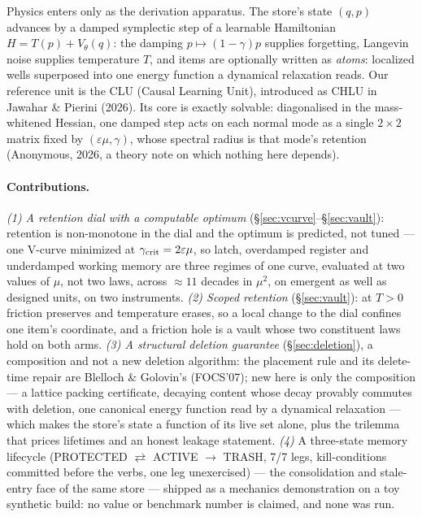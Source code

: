 Physics enters only as the derivation apparatus. The store's state $(q,p)$ advances by a damped symplectic step of a learnable Hamiltonian $H=T(p)+V_\theta(q)$: the damping $p\mapsto(1-\gamma)p$ supplies forgetting, Langevin noise supplies temperature $T$, and items are optionally written as \emph{atoms}: localized wells superposed into one energy function a dynamical relaxation reads. Our reference unit is the CLU (Causal Learning Unit), introduced as CHLU in Jawahar \& Pierini (2026). Its core is exactly solvable: diagonalised in the mass-whitened Hessian, one damped step acts on each normal mode as a single $2\times2$ matrix fixed by $(\varepsilon\mu,\gamma)$, whose spectral radius is that mode's retention (Anonymous, 2026, a theory note on which nothing here depends).

\paragraph{Contributions.} \emph{(1) A retention dial with a computable optimum} (\S\ref{sec:vcurve}--\S\ref{sec:vault}): retention is non-monotone in the dial and the optimum is predicted, not tuned --- one V-curve minimized at $\gamma_{\rm crit}=2\varepsilon\mu$, so latch, overdamped register and underdamped working memory are three regimes of one curve, evaluated at two values of $\mu$, not two laws, across $\approx11$ decades in $\mu^2$, on emergent as well as designed units, on two instruments. \emph{(2) Scoped retention} (\S\ref{sec:vault}): at $T>0$ friction preserves and temperature erases, so a local change to the dial confines one item's coordinate, and a friction hole is a vault whose two constituent laws hold on both arms. \emph{(3) A structural deletion guarantee} (\S\ref{sec:deletion}), a composition and not a new deletion algorithm: the placement rule and its delete-time repair are Blelloch \& Golovin's (FOCS'07); new here is only the composition --- a lattice packing certificate, decaying content whose decay provably commutes with deletion, one canonical energy function read by a dynamical relaxation --- which makes the store's state a function of its live set alone, plus the trilemma that prices lifetimes and an honest leakage statement. \emph{(4)} A three-state memory lifecycle (PROTECTED $\rightleftarrows$ ACTIVE $\to$ TRASH, 7/7 legs, kill-conditions committed before the verbs, one leg unexercised) --- the consolidation and stale-entry face of the same store --- shipped as a mechanics demonstration on a toy synthetic build: no value or benchmark number is claimed, and none was run.

